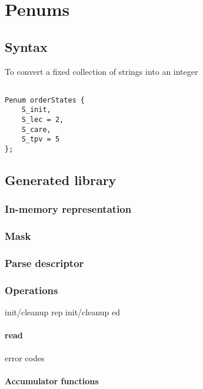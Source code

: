 \chapter{Penums}
\label{chap:enums}
\section{Syntax}
To convert a fixed collection of strings into an integer
\begin{verbatim}

Penum orderStates {
    S_init,
    S_lec = 2,
    S_care,
    S_tpv = 5
};

\end{verbatim}


\section{Generated library}
\subsection{In-memory representation}
\label{sec:enums-rep}
\subsection{Mask}
\label{sec:enums-masks}
\subsection{Parse descriptor}
\label{sec:enums-parse-descriptors}

\subsection{Operations}
init/cleanup rep
init/cleanup ed
\subsubsection{read}
  error codes
\subsubsection{Accumulator functions}

